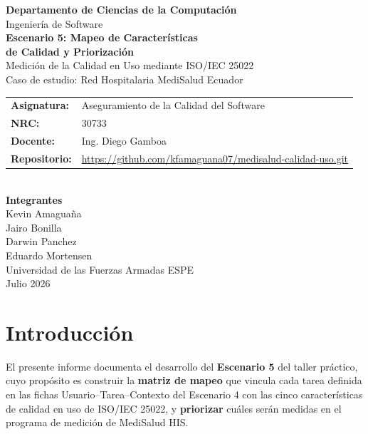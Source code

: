 \documentclass[12pt,a4paper]{article}
\begin{document}
\begin{titlepage}
\centering
{\Large \textbf{Departamento de Ciencias de la Computaci\'on}}\\[0.3cm]
{\large Ingenier\'ia de Software}\\[1.5cm]

{\LARGE \textbf{Escenario 5: Mapeo de Caracter\'isticas\\de Calidad y Priorizaci\'on}}\\[0.5cm]
{\large Medici\'on de la Calidad en Uso mediante ISO/IEC 25022}\\[0.3cm]
{\large Caso de estudio: Red Hospitalaria MediSalud Ecuador}\\[2cm]

\begin{tabular}{ll}
\textbf{Asignatura:} & Aseguramiento de la Calidad del Software \\
\textbf{NRC:}        & 30733 \\
\textbf{Docente:}    & Ing. Diego Gamboa \\
\textbf{Repositorio:} & \url{https://github.com/kfamaguana07/medisalud-calidad-uso.git} \\
\end{tabular}\\[1.5cm]

\textbf{Integrantes}\\[0.3cm]
Kevin Amagua\~na \\
Jairo Bonilla \\
Darwin Panchez \\
Eduardo Mortensen \\[2cm]

{\large Universidad de las Fuerzas Armadas ESPE}\\[0.3cm]
{\large Julio 2026}
\end{titlepage}

\tableofcontents
\newpage

\section{Introducci\'on}
El presente informe documenta el desarrollo del \textbf{Escenario 5} del taller pr\'actico, cuyo prop\'osito es construir la \textbf{matriz de mapeo} que vincula cada tarea definida en las fichas Usuario--Tarea--Contexto del Escenario 4 con las cinco caracter\'isticas de calidad en uso de ISO/IEC 25022, y \textbf{priorizar} cu\'ales ser\'an medidas en el programa de medici\'on de MediSalud HIS.
\end{document}
